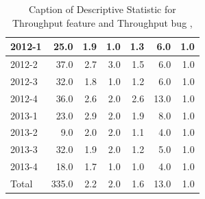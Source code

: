 \documentclass[UKenglish]{ifimaster}  %
\begin{document}
\begin{table}[!htbp]
\begin{adjustwidth}{-2.5cm}{}
{{\begin{tabular}{ | l | r | r | r | r | r | r | }
2012-1 & 25.0 & 1.9 & 1.0 & 1.3 & 6.0 & 1.0\\ \hline
2012-2 & 37.0 & 2.7 & 3.0 & 1.5 & 6.0 & 1.0\\ \hline
2012-3 & 32.0 & 1.8 & 1.0 & 1.2 & 6.0 & 1.0\\ \hline
2012-4 & 36.0 & 2.6 & 2.0 & 2.6 & 13.0 & 1.0\\ \hline
2013-1 & 23.0 & 2.9 & 2.0 & 1.9 & 8.0 & 1.0\\ \hline
2013-2 & 9.0 & 2.0 & 2.0 & 1.1 & 4.0 & 1.0\\ \hline
2013-3 & 32.0 & 1.9 & 2.0 & 1.2 & 5.0 & 1.0\\ \hline
2013-4 & 18.0 & 1.7 & 1.0 & 1.0 & 4.0 & 1.0\\ \hline
Total & 335.0 & 2.2 & 2.0 & 1.6 & 13.0 & 1.0\\ \hline
\end{tabular}
}
}
\end{adjustwidth}
\caption[Optional caption for list of figures]{Caption of Descriptive Statistic for Throughput feature and Throughput bug  , }
\label{DS:10:2}
\end{table}
\end{document}
